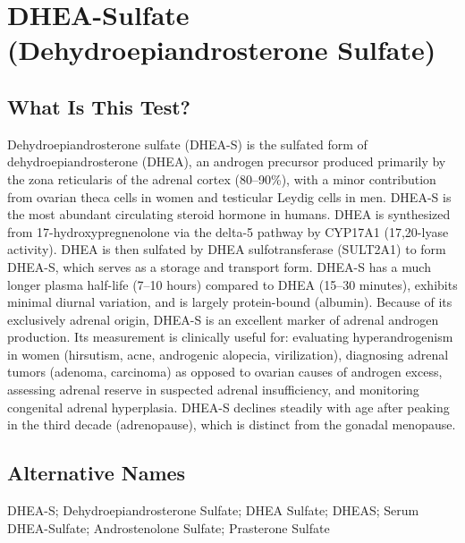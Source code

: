 \chapter{DHEA-Sulfate (Dehydroepiandrosterone Sulfate)}

\section*{What Is This Test?}
Dehydroepiandrosterone sulfate (DHEA-S) is the sulfated form of dehydroepiandrosterone (DHEA), an androgen precursor produced primarily by the zona reticularis of the adrenal cortex (80--90\%), with a minor contribution from ovarian theca cells in women and testicular Leydig cells in men. DHEA-S is the most abundant circulating steroid hormone in humans. DHEA is synthesized from 17-hydroxypregnenolone via the delta-5 pathway by CYP17A1 (17,20-lyase activity). DHEA is then sulfated by DHEA sulfotransferase (SULT2A1) to form DHEA-S, which serves as a storage and transport form. DHEA-S has a much longer plasma half-life (7--10 hours) compared to DHEA (15--30 minutes), exhibits minimal diurnal variation, and is largely protein-bound (albumin). Because of its exclusively adrenal origin, DHEA-S is an excellent marker of adrenal androgen production. Its measurement is clinically useful for: evaluating hyperandrogenism in women (hirsutism, acne, androgenic alopecia, virilization), diagnosing adrenal tumors (adenoma, carcinoma) as opposed to ovarian causes of androgen excess, assessing adrenal reserve in suspected adrenal insufficiency, and monitoring congenital adrenal hyperplasia. DHEA-S declines steadily with age after peaking in the third decade (adrenopause), which is distinct from the gonadal menopause.

\section*{Alternative Names}
DHEA-S; Dehydroepiandrosterone Sulfate; DHEA Sulfate; DHEAS; Serum DHEA-Sulfate; Androstenolone Sulfate; Prasterone Sulfate

